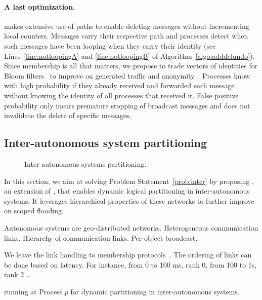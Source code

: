 

\paragraph{A last optimization.}
\NAME makes extensive use of paths to enable deleting messages without
incrementing local counters. Messages carry their respective path and
processes detect when such messages have been looping when they carry
their identity (see Lines~\ref{line:notloopingA} and
\ref{line:notloopingB} of Algorithm~\ref{algo:adddelundo}). Since
membership is all that matters, we propose to trade vectors of
identities for Bloom filters~\cite{almeida2007scalable} to improve on
generated traffic and
anonymity~\cite{whitaker2002forwarding}. Processes know with high
probability if they already received and forwarded each message
without knowing the identity of all processes that received it.  False
positive probability only incurs premature stopping of broadcast
messages and does not invalidate the delete of specific messages.



\subsection{Inter-autonomous system partitioning}

\begin{figure}
  \centering
  \caption{\label{fig:AS}Inter autonomous systems
    partitioning. }
\end{figure}

In this section, we aim at solving Problem Statement~\ref{prob:inter}
by proposing \NAMEB, an extension of \NAME, that enables dynamic
logical partitioning in inter-autonomous systems. It leverages
hierarchical properties of these networks to further improve on scoped
flooding.

Autonomous systems are geo-distributed networks. Heterogeneous
communication links. Hierarchy of communication links. Per-object
broadcast.

We leave the link handling to membership protocols~\REF. The ordering
of links can be done based on latency. For instance, from 0 to 100 ms,
rank 0, from 100 to 1s, rank 2 \ldots

\begin{algorithm}
  
  \caption{\label{algo:aaaa}\NAMEB running at Process $p$ for dynamic
    partitioning in inter-autonomous systems.}
\end{algorithm}

